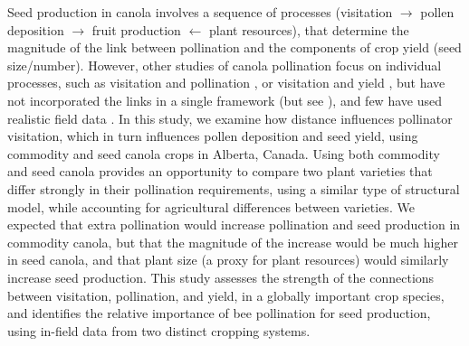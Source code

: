 \documentclass[12pt]{article} %
\begin{document}

Seed production in canola involves a sequence of processes (visitation $\rightarrow$ pollen deposition $\rightarrow$ fruit production $\leftarrow$ plant resources), that determine the magnitude of the link between pollination and the components of crop yield (seed size/number).
However, other studies of canola pollination focus on individual processes, such as visitation and pollination \citep{cresswell1999, thomson2001}, or visitation and yield \citep{steffan2003, manning2005, hudewenz2013}, but have not incorporated the links in a single framework (but see \citealp{saez2018}), and few have used realistic field data \citep{morandin2005, isaacs2010}.
In this study, we examine how distance influences pollinator visitation, which in turn influences pollen deposition and seed yield, using commodity and seed canola crops in Alberta, Canada.
Using both commodity and seed canola provides an opportunity to compare two plant varieties that differ strongly in their pollination requirements, using a similar type of structural model, while accounting for agricultural differences between varieties.
We expected that extra pollination would increase pollination and seed production in commodity canola, but that the magnitude of the increase would be much higher in seed canola, and that plant size (a proxy for plant resources) would similarly increase seed production.
This study assesses the strength of the connections between visitation, pollination, and yield, in a globally important crop species, and identifies the relative importance of bee pollination for seed production, using in-field data from two distinct cropping systems.
\end{document}
